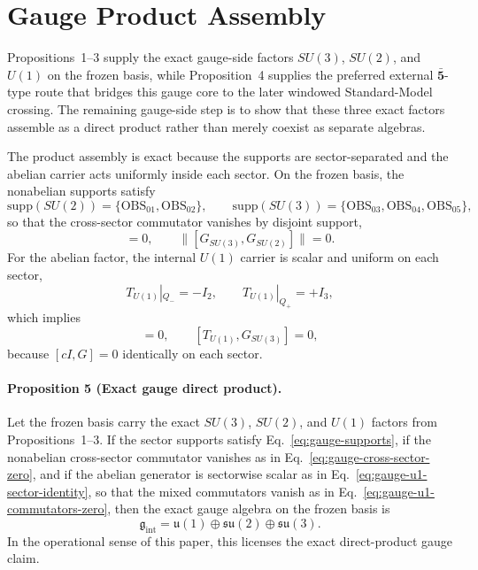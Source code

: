 \documentclass[11pt]{article}
\begin{document}
\section{Gauge Product Assembly}
Propositions~1--3 supply the exact gauge-side factors $SU(3)$, $SU(2)$, and $U(1)$ on the frozen basis, while Proposition~4 supplies the preferred external \texorpdfstring{$\bar{\mathbf 5}$}{5bar}-type route that bridges this gauge core to the later windowed Standard-Model crossing. The remaining gauge-side step is to show that these three exact factors assemble as a direct product rather than merely coexist as separate algebras.



The product assembly is exact because the supports are sector-separated and the abelian carrier acts uniformly inside each sector. On the frozen basis, the nonabelian supports satisfy
\begin{equation}
\mathrm{supp}(SU(2)) = \{\mathrm{OBS}_{01},\mathrm{OBS}_{02}\},
\qquad
\mathrm{supp}(SU(3)) = \{\mathrm{OBS}_{03},\mathrm{OBS}_{04},\mathrm{OBS}_{05}\},
\label{eq:gauge-supports}
\end{equation}
so that the cross-sector commutator vanishes by disjoint support,
\begin{equation}
[G_{SU(3)},G_{SU(2)}]=0,
\qquad
\|[G_{SU(3)},G_{SU(2)}]\|=0.
\label{eq:gauge-cross-sector-zero}
\end{equation}
For the abelian factor, the internal $U(1)$ carrier is scalar and uniform on each sector,
\begin{equation}
T_{U(1)}|_{Q_-}=-I_2,
\qquad
T_{U(1)}|_{Q_+}=+I_3,
\label{eq:gauge-u1-sector-identity}
\end{equation}
which implies
\begin{equation}
[T_{U(1)},G_{SU(2)}]=0,
\qquad
[T_{U(1)},G_{SU(3)}]=0,
\label{eq:gauge-u1-commutators-zero}
\end{equation}
because $[cI,G]=0$ identically on each sector.

\paragraph{Proposition 5 (Exact gauge direct product).}
Let the frozen basis carry the exact $SU(3)$, $SU(2)$, and $U(1)$ factors from Propositions~1--3. If the sector supports satisfy Eq.~\eqref{eq:gauge-supports}, if the nonabelian cross-sector commutator vanishes as in Eq.~\eqref{eq:gauge-cross-sector-zero}, and if the abelian generator is sectorwise scalar as in Eq.~\eqref{eq:gauge-u1-sector-identity}, so that the mixed commutators vanish as in Eq.~\eqref{eq:gauge-u1-commutators-zero}, then the exact gauge algebra on the frozen basis is
\begin{equation}
\mathfrak g_{\mathrm{int}} = \mathfrak u(1) \oplus \mathfrak{su}(2) \oplus \mathfrak{su}(3).
\label{eq:exact-gauge-product}
\end{equation}
In the operational sense of this paper, this licenses the exact direct-product gauge claim.
\end{document}
